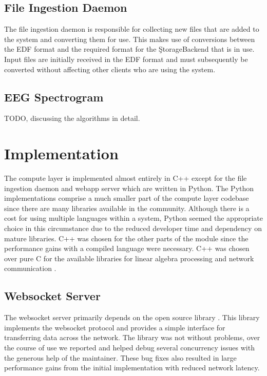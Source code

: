 \subsection{File Ingestion Daemon}

The file ingestion daemon is responsible for collecting new files that are
added to the system and converting them for use. This makes use of conversions
between the EDF format and the required format for the \c{StorageBackend} that
is in use. Input files are initially received in the EDF format and must
subsequently be converted without affecting other clients who are using the
system.

\subsection{EEG Spectrogram}\label{compute-ch:design-spectrogram}

TODO, discussing the algorithms in detail.

\section{Implementation}

The compute layer is implemented almost entirely in C++ except for the file
ingestion daemon and webapp server which are written in Python. The Python
implementations comprise a much smaller part of the compute layer codebase
since there are many libraries available in the community. Although there is a
cost for using multiple languages within a system, Python seemed the
appropriate choice in this circumstance due to the reduced developer time and
dependency on mature libraries. C++ was chosen for the other parts of the
module since the performance gains with a compiled language were necessary. C++
was chosen over pure C for the available libraries for linear algebra
processing \cite{arma} and network communication \cite{websocket-server}.

\subsection{Websocket Server}

The websocket server primarily depends on the open source library
\cite{websocket-server}. This library implements the websocket protocol and
provides a simple interface for transferring data across the network. The
library was not without problems, over the course of use we reported and helped
debug several concurrency issues with the generous help of the maintainer.
These bug fixes also resulted in large performance gains from the initial
implementation with reduced network latency. \\

